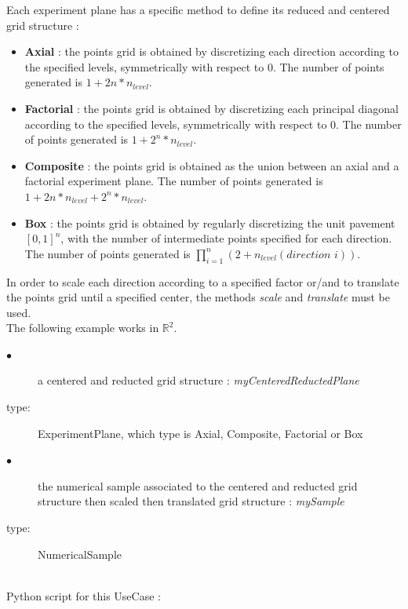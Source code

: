 Each experiment plane has a specific method to define its reduced and centered grid structure :
\begin{itemize}
\item {\bf Axial} : the  points grid is obtained by discretizing each direction according to the specified levels, symmetrically with respect to 0. The number of points generated is $1 + 2n* n_{level}$.
\item {\bf Factorial} : the  points grid is obtained by discretizing each principal diagonal according to the specified levels, symmetrically with respect to 0. The number of points generated is $1 +  2^n*n_{level}$.
\item {\bf Composite} : the  points grid is obtained as the union between an axial and a factorial experiment plane. The number of points generated is $1 + 2n*n_{level} +  2^n*n_{level}$.
\item {\bf Box} : the  points grid is obtained by regularly discretizing the unit pavement $[0, 1]^n$, with the number of intermediate points specified for each direction.  The number of points generated is $\displaystyle \prod_{i=1}^{n} (2+n_{level}(direction \, \, i))$.
\end{itemize}

In order to scale each direction according to a specified factor or/and to translate the points grid until a specified center, the methods {\itshape scale} and {\itshape translate} must be used.\\

The following example works in $\mathbb{R}^2$.\\

{
  \begin{description}
  \item[$\bullet$] a centered and reducted grid structure : {\itshape myCenteredReductedPlane}
  \item[type:] ExperimentPlane, which type is Axial, Composite, Factorial or Box
  \item[$\bullet$] the numerical sample associated to the centered and reducted grid structure then scaled then translated grid structure : {\itshape mySample}
  \item[type:] NumericalSample
  \end{description}
}

\textspace\\
Python script for this UseCase :



